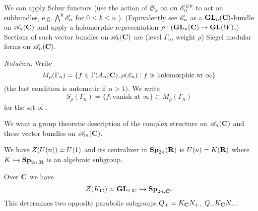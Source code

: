 We can apply Schur functors (use the action of $\mathfrak{S}_k$ on on $\mathscr{E}_n^{\otimes k}$ to act on subbundles, e.g. $\bigwedge^{k}\mathscr{E}_n$ for $0\le k\le n$ ). (Equivalently see $\mathscr{E}_n$ as a $\mathbf{GL}_n(\mathbf{C})$-bundle on $\mathscr{A}_n(\mathbf{C})$ and apply a holomorphic representation $\rho:(\GL_n(\bb{C})\to \GL(W)$.)
Sections of such vector bundles on $\mathscr{A}_k(\mathbf{C})$ are (level $\Gamma_n$, weight $\rho$) Siegel modular forms on $\mathscr{A}_n(\mathbf{C})$.

\emph{Notation:} Write
\[
	M_\rho(\Gamma_n) = \left\{ f\in \Gamma(A_n(\mathbf{C}),\rho(\mathscr{E}_n):f\text{ is holomorphic at }\infty \right\} 
\]
(the last condition is automatic if $n>1$). We write
\[
S_\rho(\Gamma_n) = \{f:\text{vanish at }\infty\} \subset M_\rho(\Gamma_n)
\]
for the set of .

We want a group theoretic description of the complex structure on $\mathscr{A}_n(\mathbf{C})$ and these vector bundles on $\mathscr{A}_m(\mathbf{C})$.

We have $Z(U(n))\simeq U(1)$ and its centralizer in $\mathbf{Sp}_{2n}(\mathbf{R})$ is $U(n)=K(\mathbf{R})$ where $K\hookrightarrow \mathbf{Sp}_{2n,\mathbf{R}}$ is an algebraic subgroup.

Over $\mathbf{C}$ we have
\[
	Z(K_{\mathbf{C}}) \simeq \mathbf{GL}_{1,\mathbf{C}} \hookrightarrow \mathbf{Sp}_{2n,\mathbf{C}}.
\] 
This determines two opposite parabolic subgroups $Q_+=K_{\mathbf{C}}N_+$, $Q_{-}K_{\mathbf{C}}N_-$.

